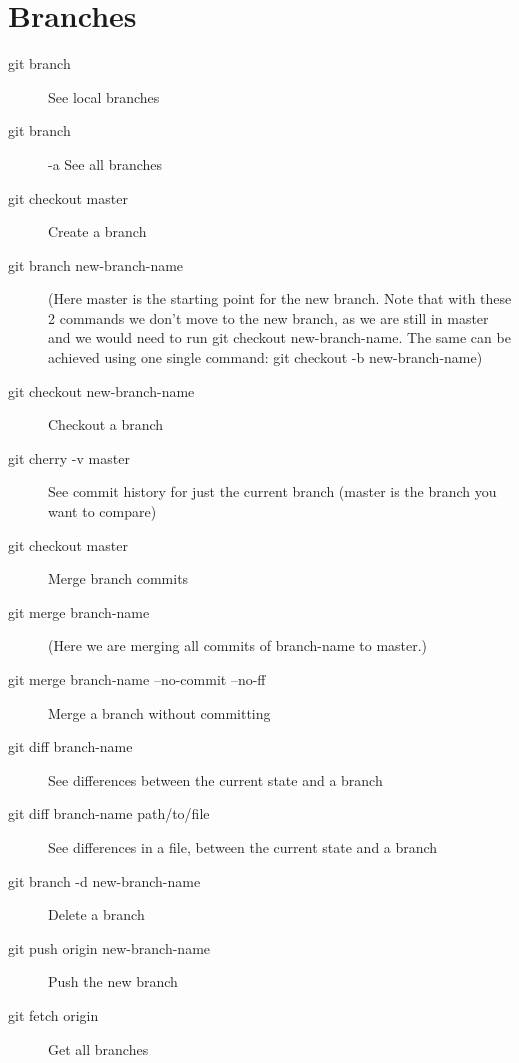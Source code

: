 \documentclass{article}
\begin{document}
\section{Branches}
\begin{description}
    \item [git branch] See local branches
    \item [git branch] -a See all branches
    \item [git checkout master]
        Create a branch
    \item [git branch new-branch-name]
        (Here master is the starting point for the new branch. Note that with these 2
        commands we don't move to the new branch, as we are still in master and we
        would need to run git checkout new-branch-name. The same can be achieved using
        one single command: git checkout -b new-branch-name)
    \item [git checkout new-branch-name]
        Checkout a branch
    \item [git cherry -v master]
        See commit history for just the current branch
        (master is the branch you want to compare)
    \item [git checkout master]
        Merge branch commits
    \item [git merge branch-name]
        (Here we are merging all commits of branch-name to master.)
    \item [git merge branch-name --no-commit --no-ff]
        Merge a branch without committing
    \item [git diff branch-name]
        See differences between the current state and a branch
    \item [git diff branch-name path/to/file]
        See differences in a file, between the current state and a branch
    \item [git branch -d new-branch-name]
        Delete a branch
    \item [git push origin new-branch-name]
        Push the new branch
    \item [git fetch origin]
        Get all branches
\end{description}
\end{document}
